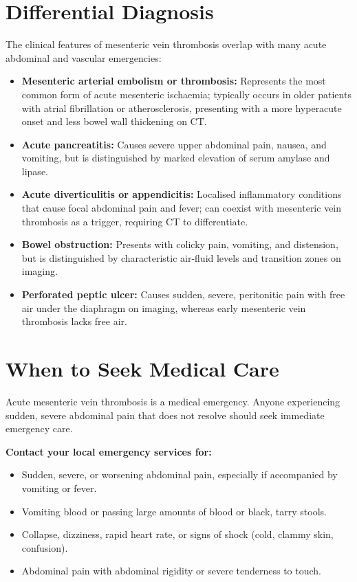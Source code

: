 \section*{Differential Diagnosis}
The clinical features of mesenteric vein thrombosis overlap with many acute abdominal and vascular emergencies:
\begin{itemize}
    \item \textbf{Mesenteric arterial embolism or thrombosis:} Represents the most common form of acute mesenteric ischaemia; typically occurs in older patients with atrial fibrillation or atherosclerosis, presenting with a more hyperacute onset and less bowel wall thickening on CT.
    \item \textbf{Acute pancreatitis:} Causes severe upper abdominal pain, nausea, and vomiting, but is distinguished by marked elevation of serum amylase and lipase.
    \item \textbf{Acute diverticulitis or appendicitis:} Localised inflammatory conditions that cause focal abdominal pain and fever; can coexist with mesenteric vein thrombosis as a trigger, requiring CT to differentiate.
    \item \textbf{Bowel obstruction:} Presents with colicky pain, vomiting, and distension, but is distinguished by characteristic air-fluid levels and transition zones on imaging.
    \item \textbf{Perforated peptic ulcer:} Causes sudden, severe, peritonitic pain with free air under the diaphragm on imaging, whereas early mesenteric vein thrombosis lacks free air.
\end{itemize}

\section*{When to Seek Medical Care}
Acute mesenteric vein thrombosis is a medical emergency. Anyone experiencing sudden, severe abdominal pain that does not resolve should seek immediate emergency care.

\textbf{Contact your local emergency services for:}
\begin{itemize}
    \item Sudden, severe, or worsening abdominal pain, especially if accompanied by vomiting or fever.
    \item Vomiting blood or passing large amounts of blood or black, tarry stools.
    \item Collapse, dizziness, rapid heart rate, or signs of shock (cold, clammy skin, confusion).
    \item Abdominal pain with abdominal rigidity or severe tenderness to touch.
\end{itemize}

